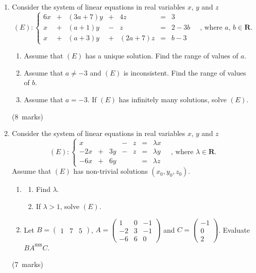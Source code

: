 \documentclass[12pt, a4paper]{article} %
\newcommand{\qmarks}[1]{\leavevmode\unskip\hspace*{\fill}\mbox{(#1 marks)}}
\begin{document}
\begin{enumerate}
    \item Consider the system of linear equations in real variables \(x\), \(y\) and \(z\)
    \[
        (E): \left\{
        \begin{array}{ccccccc}
             6x & +  & (3a+7)y  & + & 4z  & = & 3 \\
            x & + & (a+1)y & - & z & = & 2-3b \\
            x & +  & (a+3)y  & + & (2a+7)z  & = & b-3
        \end{array}
        \right.
        \quad \text{, where } a,\, b \in \mathbf{R}.
    \]
    \begin{enumerate}
        \item Assume that \((E)\) has a unique solution. Find the range of values of \(a\).
        \item Assume that \(a\neq-3\) and \((E)\) is inconsistent. Find the range of values of \(b\).
        \item Assume that \(a=-3\). If \((E)\) has infinitely many solutions, solve \((E)\).
    \end{enumerate}\qmarks{8}

    \item Consider the system of linear equations in real variables \(x\), \(y\) and \(z\)
    \[
        (E): \left\{
        \begin{array}{ccccccc}
             x &   &   & - & z  & = & \lambda x \\
            -2x & + & 3y & - & z & = & \lambda y \\
            -6x & +  & 6y  &  &   & = & \lambda z
        \end{array}
        \right.
        \quad \text{, where } \lambda \in \mathbf{R}.
    \]
    Assume that \((E)\) has non-trivial solutions \((x_0, y_0, z_0)\).
    \begin{enumerate}
        \item \begin{enumerate}[label=(\roman*)]
            \item Find \(\lambda\).
            \item If \(\lambda>1\), solve \((E)\).
        \end{enumerate}
        \item Let \(B=\begin{pmatrix}
            1&7&5
        \end{pmatrix}\), \(A=\begin{pmatrix}
            1&0&-1\\
            -2&3&-1\\
            -6&6&0
        \end{pmatrix}\) and \(C=\begin{pmatrix}
            -1\\0\\2
        \end{pmatrix}\). Evaluate \(BA^{888}C\).
    \end{enumerate}\qmarks{7}


\end{enumerate}
\end{document}
